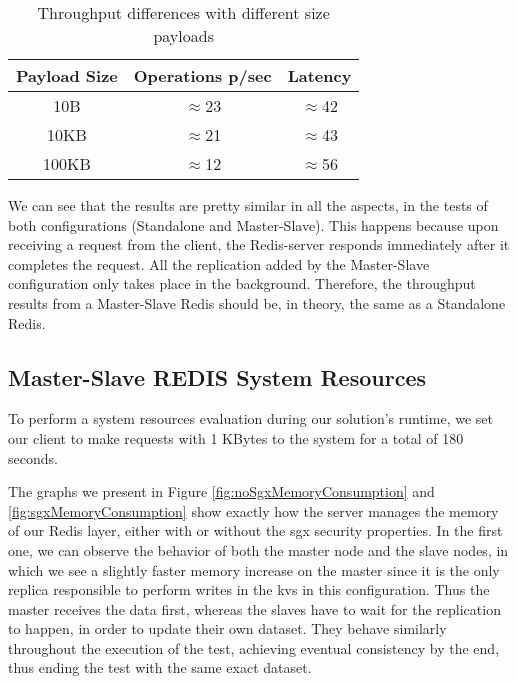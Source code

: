 \begin{table}[ht]
	\caption{Throughput differences with different size payloads} %
	\centering %
	\begin{tabular}{c c c} %
		\hline\hline %
		\textbf{Payload Size} & \textbf{Operations p/sec} & \textbf{Latency}\\ [0.5ex] %
		\hline
		10B & $\approx$23 & $\approx$42\\
		\hline
		10KB & $\approx$21 & $\approx$43\\
		\hline %
		100KB & $\approx$12 & $\approx$56\\ [1ex] %
		\hline %
	\end{tabular}
	\label{table:throughputPayloadsMS} %
\end{table} 

We can see that the results are pretty similar in all the aspects, in the tests of both configurations (Standalone and Master-Slave). This happens because upon receiving a request from the client, the Redis-server responds immediately after it completes the request. All the replication added by the Master-Slave configuration only takes place in the background. Therefore, the throughput results from a Master-Slave Redis should be, in theory, the same as a Standalone Redis.



\subsection{Master-Slave REDIS System Resources}
\label{ssec:MSRedis_MemCPU}

To perform a system resources evaluation during our solution's runtime, we set our client to make requests with 1 KBytes to the system for a total of 180 seconds.  

The graphs we present in Figure \ref{fig:noSgxMemoryConsumption} and \ref{fig:sgxMemoryConsumption} show exactly how the server manages the memory of our Redis layer, either with or without the \gls{sgx} security properties. 
In the first one, we can observe the behavior of both the master node and the slave nodes, in which we see a slightly faster memory increase on the master since it is the only replica responsible to perform writes in the \gls{kvs} in this configuration. Thus the master receives the data first, whereas the slaves have to wait for the replication to happen, in order to update their own dataset. 
They behave similarly throughout the execution of the test, achieving eventual consistency by the end, thus ending the test with the same exact dataset. 

